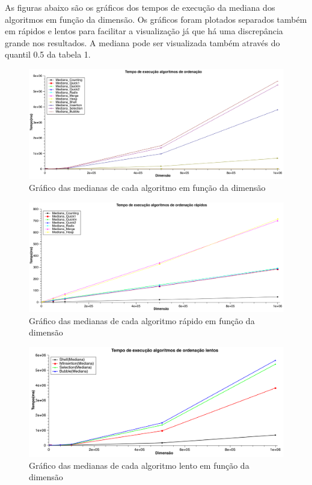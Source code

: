 \documentclass[a4paper, 10pt]{article}
\begin{document}
As figuras abaixo são os gráficos dos tempos de execução da mediana dos algoritmos em função da dimensão. Os gráficos foram plotados separados também em rápidos e lentos para facilitar a visualização já que há uma discrepância grande nos resultados. A mediana pode ser visualizada também através do quantil 0.5 da tabela 1.
\begin{figure}
	\centering
	\includegraphics[scale=0.25]{algoritmos.png}
	\caption{Gráfico das medianas de cada algoritmo em função da dimensão}
	\label{Rotulo}
\end{figure}
\begin{figure}
	\centering
	\includegraphics[scale=0.25]{algoritmosrapidos.png}
	\caption{Gráfico das medianas de cada algoritmo rápido em função da dimensão}
	\label{Rotulo}
\end{figure}
\begin{figure}
	\centering
	\includegraphics[scale=0.25]{algoritmoslentos.png}
	\caption{Gráfico das medianas de cada algoritmo lento em função da dimensão}
	\label{Rotulo}
\end{figure}
\clearpage
\end{document}
